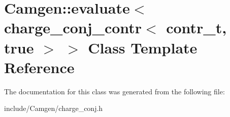 \hypertarget{a00143}{\section{Camgen\-:\-:evaluate$<$ charge\-\_\-conj\-\_\-contr$<$ contr\-\_\-t, true $>$ $>$ Class Template Reference}
\label{a00143}
}


The documentation for this class was generated from the following file\-:\begin{DoxyCompactItemize}
\item 
include/\-Camgen/charge\-\_\-conj.\-h\end{DoxyCompactItemize}
